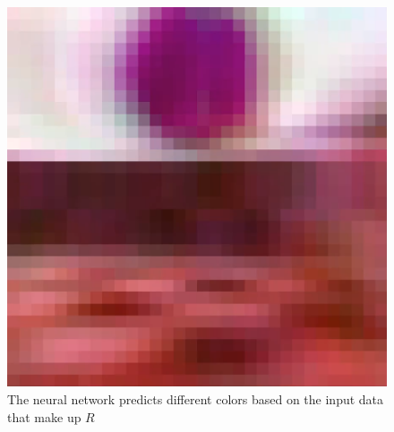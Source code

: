 \begin{figure}[p]
  \includegraphics[width=\imgWithTripple]{images/workflow/FunctionalF3.png}
  \caption{The neural network predicts different colors based on the input data that make up $R$}
  \label{FunctionalFirstPerson}
\end{figure}

